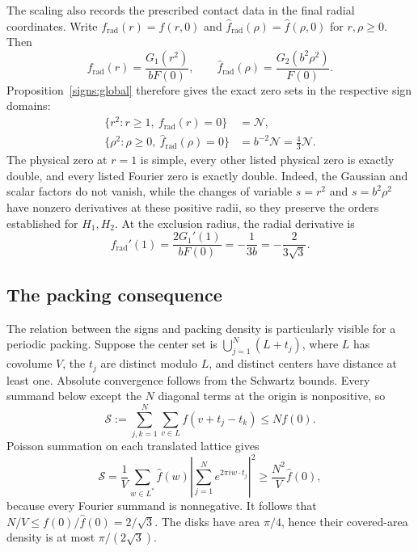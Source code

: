 The scaling also records the prescribed contact data in the final radial
coordinates.  Write $f_{\mathrm{rad}}(r)=f(r,0)$ and
$\widehat f_{\mathrm{rad}}(\rho)=\widehat f(\rho,0)$ for $r,\rho\ge0$.  Then
\[
 f_{\mathrm{rad}}(r)=\frac{G_1(r^2)}{bF(0)},\qquad
 \widehat f_{\mathrm{rad}}(\rho)=\frac{G_2(b^2\rho^2)}{F(0)}.
\]
Proposition~\ref{signs:global} therefore gives the exact zero sets in the
respective sign domains:
\begin{equation}\label{normalization:zero-sets}
 \begin{aligned}
 \{r^2:r\ge1,\ f_{\mathrm{rad}}(r)=0\}&=\mathcal N,\\
 \{\rho^2:\rho\ge0,\ \widehat f_{\mathrm{rad}}(\rho)=0\}
   &=b^{-2}\mathcal N=\frac43\mathcal N.
 \end{aligned}
\end{equation}
The physical zero at $r=1$ is simple, every other listed physical zero is
exactly double, and every listed Fourier zero is exactly double.  Indeed,
the Gaussian and scalar factors do not vanish, while the changes of
variable $s=r^2$ and $s=b^2\rho^2$ have nonzero derivatives at these positive
radii, so they preserve the orders established for $H_1,H_2$.
At the exclusion radius, the radial derivative is
\begin{equation}\label{normalization:radial-slope}
 f_{\mathrm{rad}}'(1)
 =\frac{2G_1'(1)}{bF(0)}=-\frac{1}{3b}=-\frac{2}{3\sqrt3}.
\end{equation}

\subsection{The packing consequence}

The relation between the signs and packing density is particularly visible
for a periodic packing.  Suppose the center set is
$\bigcup_{j=1}^N(L+t_j)$, where $L$ has covolume $V$, the $t_j$ are distinct
modulo $L$, and distinct centers have distance at least one.  Absolute
convergence follows from the Schwartz bounds.  Every summand below except
the $N$ diagonal terms at the origin is nonpositive, so
\[
 \mathcal S:=\sum_{j,k=1}^N\sum_{v\in L}f(v+t_j-t_k)\le Nf(0).
\]
Poisson summation on each translated lattice gives
\[
 \mathcal S=\frac1V\sum_{w\in L^*}\widehat f(w)
       \left|\sum_{j=1}^N e^{2\pi i w\cdot t_j}\right|^2
 \ge\frac{N^2}{V}\widehat f(0),
\]
because every Fourier summand is nonnegative.  It follows that
$N/V\le f(0)/\widehat f(0)=2/\sqrt3$.  The disks have area $\pi/4$, hence
their covered-area density is at most $\pi/(2\sqrt3)$.

